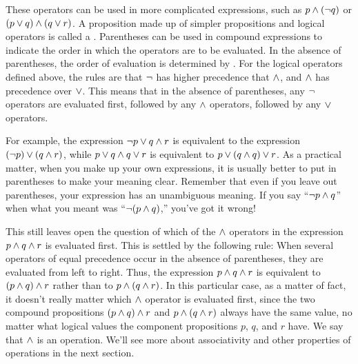 These operators can be used in more complicated expressions,
such as $p\wedge(\lnot q)$ or $(p\vee q)\wedge(q\vee r)$.  A
proposition made up of simpler propositions and logical operators
is called a .  Parentheses can be used
in compound expressions to indicate the order in which the
operators are to be evaluated.  In the absence of parentheses,
the order of evaluation is determined by .
For the logical operators defined above, the rules are that
$\lnot$ has higher precedence that $\wedge$, and $\wedge$ has precedence
over $\vee$.  This means that in the absence of parentheses,
any $\lnot$ operators are evaluated first, followed by any
$\wedge$ operators, followed by any $\vee$ operators.

For example, the expression $\lnot p \vee q \wedge r$ is
equivalent to the expression $(\lnot p)\vee (q\wedge r)$,
while $p\vee q \wedge q \vee r$ is equivalent to
$p \vee (q \wedge q) \vee r$.  As a practical matter, when you make
up your own expressions, it is usually better to put in parentheses
to make your meaning clear.  Remember that even if you leave out
parentheses, your expression has an unambiguous meaning.
If you say ``$\lnot p \wedge q$'' when what you meant was
``$\lnot (p\wedge q)$,'' you've got it wrong!

This still leaves open the question of which of the $\wedge$ operators
in the expression $p\wedge q \wedge r$ is evaluated first.
This is settled by the following rule:  When several operators
of equal precedence occur in the absence of parentheses, they
are evaluated from left to right.  Thus, the expression
$p\wedge q\wedge r$ is equivalent to $(p\wedge q)\wedge r$
rather than to $p\wedge(q\wedge r)$.
In this particular case, as a matter of fact, it doesn't really matter
which $\wedge$ operator is evaluated first, since 
the two compound propositions $(p\wedge q)\wedge r$ and
$p\wedge (q\wedge r)$ always have the same value,
no matter what logical values the component propositions $p$,
$q$, and $r$ have.  We say that $\wedge$ is an
 operation.  We'll see more about associativity
and other properties of operations in the next section.

